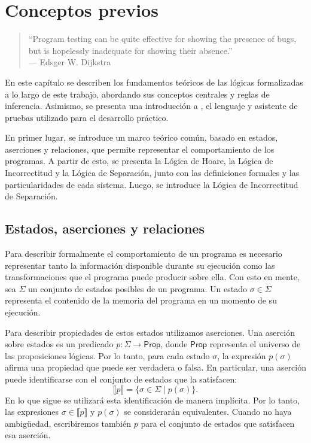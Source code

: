 \documentclass[a4paper,	11pt]{report}
\begin{document}

\chapter{Conceptos previos}
\label{cap:conceptos-previos}
\begin{quote}
``Program testing can be quite effective for showing the presence of bugs, but is hopelessly inadequate for showing their absence.'' \\
\raggedleft --- Edsger W. Dijkstra
\end{quote}

En este capítulo se describen los fundamentos teóricos de las lógicas formalizadas a lo largo de este trabajo,
abordando sus conceptos centrales y reglas de inferencia.
Asimismo, se presenta una introducción a \fstar, el lenguaje y asistente de pruebas utilizado para el desarrollo práctico.

En primer lugar, se introduce un marco teórico común,
basado en estados, aserciones y relaciones, que permite representar el comportamiento de los programas.
A partir de esto, se presenta la Lógica de Hoare, la Lógica de Incorrectitud y la Lógica de Separación,
junto con las definiciones formales y las particularidades de cada sistema.
Luego, se introduce la Lógica de Incorrectitud de Separación.

\section{Estados, aserciones y relaciones}
Para describir formalmente el comportamiento de un programa es necesario representar tanto la información
disponible durante su ejecución como las transformaciones que el programa puede producir sobre ella.
Con esto en mente, sea $\Sigma$ un conjunto de estados posibles de un programa.
Un estado $\sigma \in \Sigma$ representa el contenido de la memoria del programa en un momento de su ejecución.

Para describir propiedades de estos estados utilizamos aserciones.
Una aserción sobre estados es un predicado $p : \Sigma \rightarrow \mathsf{Prop}$,
donde $\mathsf{Prop}$ representa el universo de las proposiciones lógicas.
Por lo tanto, para cada estado $\sigma$, la expresión $p(\sigma)$ afirma una propiedad que puede ser verdadera o falsa.
En particular, una aserción puede identificarse con el conjunto de estados que la satisfacen:
$$\llbracket p \rrbracket = \{\sigma \in \Sigma \mid p(\sigma)\}.$$
En lo que sigue se utilizará esta identificación de manera implícita.
Por lo tanto, las expresiones $\sigma \in \llbracket p \rrbracket$ y $p(\sigma)$ se considerarán equivalentes.
Cuando no haya ambigüedad,
escribiremos también $p$ para el conjunto de estados que satisfacen esa aserción.
\end{document}
